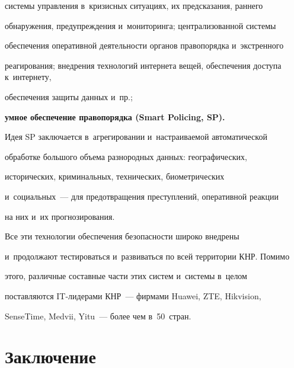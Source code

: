 \begin{description}
системы управления в~кризисных ситуациях, их предсказания, раннего 


обнаружения, предупреждения и~мониторинга; централизованной сис\-те\-мы 


обеспечения оперативной деятельности органов правопорядка и~экстренного 


реагирования; внед\-ре\-ния технологий интернета вещей, обеспечения доступа к~интернету, 


обеспечения защиты данных и~пр.;


     \item[\,] \textbf{умное обеспечение правопорядка (Smart Policing, SP).} 


Идея SP заключается в~агрегировании и~на\-стра\-ива\-емой автоматической 


обработке большого объема разнородных данных: географических, 


исторических, криминальных, технических, био\-мет\-ри\-че\-ских  


и~социальных~--- для предотвращения преступлений, оперативной реакции 


на них и~их прогнозирования.


\end{description}


     


     Все эти технологии обеспечения безопасности широко внед\-ре\-ны 


     и~продолжают тестироваться и~развиваться по всей территории КНР. Помимо 


этого, различные со\-став\-ные час\-ти этих сис\-тем и~сис\-те\-мы в~целом 


по\-став\-ля\-ют\-ся IT-ли\-де\-ра\-ми КНР~--- фирмами Huawei, ZTE, Hikvision, 


SenseTime, Medvii, Yitu~--- более чем в~50~стран.





\vspace*{-6pt}





\section{Заключение}





\vspace*{-2pt}


